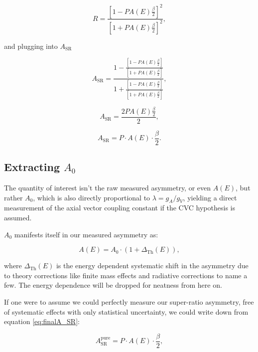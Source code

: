 \begin{equation*}
R = \frac{ \left[ 1 -  P  A(E) \frac{\beta}{2} \right]^2 }
{  \left[ 1 + P  A(E) \frac{\beta}{2}  \right]^2 },
\end{equation*}

\noindent and plugging into $A_{\mathrm{SR}}$

\begin{equation*}
  A_{\mathrm{SR}} = \frac{1-\frac{ \left[ 1 -  P  A(E) \frac{\beta}{2} \right] }
{  \left[ 1 + P  A(E) \frac{\beta}{2}  \right] } }
  {1+\frac{ \left[ 1 -  P  A(E) \frac{\beta}{2} \right] }
{  \left[ 1 + P  A(E) \frac{\beta}{2}  \right] }},
\end{equation*}

\begin{equation*}
A_{\mathrm{SR}} = \frac{2 P A(E) \frac{\beta}{2}}{2},
\end{equation*}


\begin{equation}
A_{\mathrm{SR}} = P \cdot A(E) \cdot \frac{\beta}{2}.
\end{equation}

\subsection{Extracting $A_0$}

The quantity of interest isn't the raw measured asymmetry, or even $A(E)$, but rather $A_0$, which is also directly proportional to $\lambda=g_A/g_V$, yielding a direct 
measurement of the axial vector coupling constant if the CVC hypothesis is assumed. 

$A_0$ manifests itself in our measured asymmetry as:

\begin{equation}
A(E) = A_0 \cdot \left( 1 + \Delta_{\mathrm{Th}}(E) \right),
\end{equation}

\noindent where $\Delta_{\mathrm{Th}}(E)$ is the energy dependent systematic shift in the
asymmetry due to theory corrections like finite mass effects and radiative 
corrections to name a few. The energy dependence will be dropped for neatness from here on.

If one were to assume we could perfectly measure our super-ratio asymmetry, free of
systematic effects with only statistical uncertainty, we could write down from 
equation \ref{eq:finalA_SR}:

\begin{equation}
A_{\mathrm{SR}}^{\mathrm{pure}} = P \cdot A(E) \cdot \frac{\beta}{2}, 
\end{equation}

